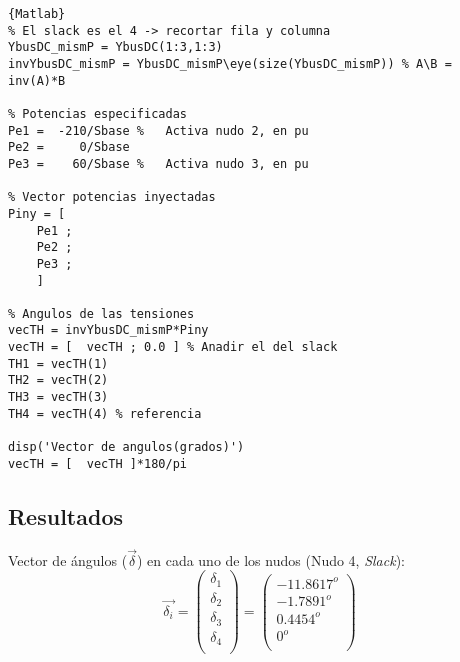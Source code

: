 \documentclass[a4paper,10pt,titlepage,oneside]{article}
\begin{document}
{\begin{lstlisting}[frame=lines]{Matlab}
% El slack es el 4 -> recortar fila y columna
YbusDC_mismP = YbusDC(1:3,1:3)
invYbusDC_mismP = YbusDC_mismP\eye(size(YbusDC_mismP)) % A\B = inv(A)*B

% Potencias especificadas
Pe1 =  -210/Sbase %   Activa nudo 2, en pu
Pe2 =     0/Sbase
Pe3 =    60/Sbase %   Activa nudo 3, en pu

% Vector potencias inyectadas
Piny = [
	Pe1 ;
    Pe2 ;
	Pe3 ;
	]

% Angulos de las tensiones
vecTH = invYbusDC_mismP*Piny
vecTH = [  vecTH ; 0.0 ] % Anadir el del slack
TH1 = vecTH(1)  
TH2 = vecTH(2) 
TH3 = vecTH(3) 
TH4 = vecTH(4) % referencia

disp('Vector de angulos(grados)')
vecTH = [  vecTH ]*180/pi
\end{lstlisting}

\subsection{Resultados}
Vector de ángulos ($\vec{\delta}$) en cada uno de los nudos (Nudo 4, \textit{Slack}):
\begin{equation}
    \vec{\delta_i} = \begin{pmatrix} 
    \delta_1 \\
    \delta_2 \\
    \delta_3 \\
    \delta_4 \\
    \end{pmatrix} =
    \begin{pmatrix}
    -11.8617^o\\
    -1.7891^o \\
    0.4454^o \\
         0^o \\
    \end{pmatrix} 
\end{equation}

\newpage

}
\end{document}
